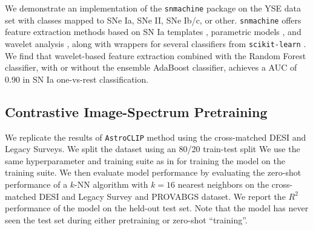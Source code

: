  We demonstrate an implementation of the \texttt{snmachine} package \citep{lochner2021, alves2022} on the YSE data set with classes mapped to SNe Ia, SNe II, SNe Ib/c, or other.
\texttt{snmachine} offers feature extraction methods based on SN Ia templates \citep{guy2010}, parametric models \citep{newling2012, karpenka2013}, and wavelet analysis \citep{lee2019}, along with wrappers for several classifiers from \texttt{scikit-learn} \citep{pedregosa2011}.
We find that wavelet-based feature extraction combined with the Random Forest classifier, with or without the ensemble AdaBoost classifier, achieves a AUC of 0.90%
in SN Ia one-vs-rest classification.


\subsection{Contrastive Image-Spectrum Pretraining}
\label{app:contrastive}

We replicate the results of \texttt{AstroCLIP} method \cite{Parker2024} using the \pile cross-matched DESI and Legacy Surveys. We split the dataset using an 80/20 train-test split We use the same hyperparameter and training suite as in \cite{Parker2024} for training the model on the training suite. We then evaluate model performance by evaluating the zero-shot performance of a $k$-NN algorithm with $k=16$ nearest neighbors on the cross-matched DESI and Legacy Survey and PROVABGS dataset. We report the $R^2$ performance of the model on the held-out test set. Note that the model has never seen the test set during either pretraining or zero-shot ``training''.
